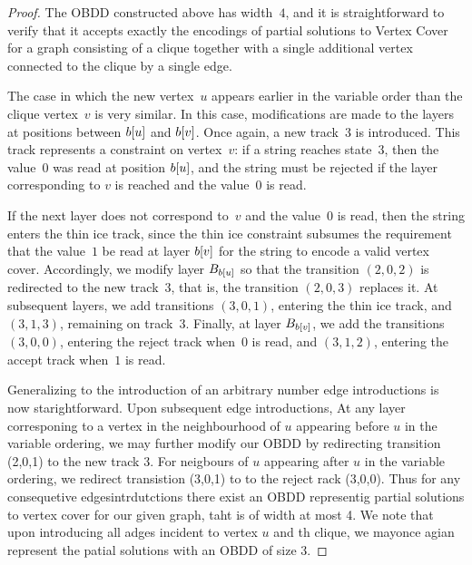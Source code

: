 \begin{proof}
The OBDD constructed above has width~$4$, and it is straightforward to verify
that it accepts exactly the encodings of partial solutions to {\sc Vertex Cover}
for a graph consisting of a clique together with a single additional vertex
connected to the clique by a single edge.

The case in which the new vertex~$u$ appears earlier in the variable order than
the clique vertex~$v$ is very similar. In this case, modifications are made to
the layers at positions between $b[u]$ and $b[v]$. Once
again, a new track~$3$ is introduced. This track represents a constraint on
vertex~$v$: if a string reaches state~$3$, then the value~$0$ was read at position
$b[u]$, and the string must be rejected if the layer corresponding to
$v$ is reached and the value~$0$ is read.

If the next layer does not correspond to~$v$ and the value~$0$ is read, then the
string enters the thin ice track, since the thin ice constraint subsumes the
requirement that the value~$1$ be read at layer $b[v]$ for the string
to encode a valid vertex cover. Accordingly, we modify layer
$B_{b[u]}$ so that the transition $(2,0,2)$ is redirected to the new
track~$3$, that is, the transition $(2,0,3)$ replaces it. At subsequent layers,
we add transitions $(3,0,1)$, entering the thin ice track, and $(3,1,3)$,
remaining on track~$3$. Finally, at layer $B_{b[v]}$, we add the
transitions $(3,0,0)$, entering the reject track when~$0$ is read, and $(3,1,2)$,
entering the accept track when~$1$ is read.

Generalizing to the introduction of an arbitrary number edge introductions is now starightforward. Upon subsequent edge introductions, At any layer corresponing to a vertex in the neighbourhood of $u$ appearing before $u$ in the variable ordering, we may further modify our OBDD by redirecting transition (2,0,1) to the new track 3. For neigbours of $u$ appearing after $u$ in the variable ordering, we redirect transistion (3,0,1) to to the reject rack (3,0,0). Thus for any consequetive edgesintrdutctions there exist an OBDD representig partial solutions to vertex cover for our given graph, taht is of width at most 4. We note that upon introducing all adges incident to vertex $u$ and th clique, we mayonce agian represent the patial solutions with an OBDD of size 3.


\end{proof}
